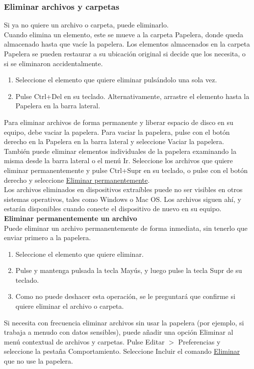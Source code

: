 \subsubsection{Eliminar archivos y carpetas}
Si ya no quiere un archivo o carpeta, puede eliminarlo.\\
Cuando elimina un elemento, este se mueve a la carpeta Papelera, donde queda almacenado hasta que vacíe la papelera. Los elementos almacenados en la carpeta Papelera se pueden restaurar a su ubicación original si decide que los necesita, o si se eliminaron accidentalmente.
\begin{enumerate}
\item  Seleccione el elemento que quiere eliminar pulsándolo una sola vez.
\item Pulse Ctrl+Del en su teclado. Alternativamente, arrastre el elemento hasta la Papelera en la barra lateral.
\end{enumerate}
Para eliminar archivos de forma permanente y liberar espacio de disco en su equipo, debe vaciar la papelera. Para vaciar la papelera, pulse con el botón derecho en la Papelera en la barra lateral y seleccione Vaciar la papelera. También puede eliminar elementos individuales de la papelera examinando la misma desde la barra lateral o el menú Ir. Seleccione los archivos que quiere eliminar permanentemente y pulse Ctrl+Supr en su teclado, o pulse con el botón derecho y seleccione \underline{Eliminar permanentemente}.\\

Los archivos eliminados en dispositivos extraíbles puede no ser visibles en otros sistemas operativos, tales como Windows o Mac OS. Los archivos siguen ahí, y estarán disponibles cuando conecte el dispositivo de nuevo en su equipo.\\

{\bf Eliminar permanentemente un archivo}\\
Puede eliminar un archivo permanentemente de forma inmediata, sin tenerlo que enviar primero a la papelera.
\begin{enumerate}
\item Seleccione el elemento que quiere eliminar.
\item Pulse y mantenga pulsada la tecla Mayús, y luego pulse la tecla Supr de su teclado.
\item Como no puede deshacer esta operación, se le preguntará que confirme si quiere eliminar el archivo o carpeta.
\end{enumerate}
Si necesita con frecuencia eliminar archivos sin usar la papelera (por ejemplo, si trabaja a menudo con datos sensibles), puede añadir una opción Eliminar al menú contextual de archivos y carpetas. Pulse Editar $>$ Preferencias y seleccione la pestaña Comportamiento. Seleccione Incluir el comando \underline{Eliminar} que no use la papelera.
